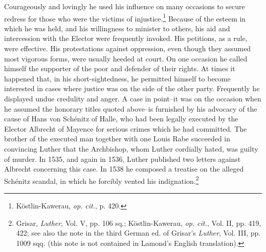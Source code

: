 Courageously and lovingly he used his influence on many occasions
to secure redress for those who were the victims of injustice.\footnote
{Köstlin-Kawerau, \textit{op. cit.}, p. 420.}
Because of the esteem in which he was held, and his willingness to
minister to others, his aid and intercession with the Elector were frequently
invoked. His petitions, as a rule, were effective. His protestations against
oppression, even though they assumed most vigorous
forms, were usually heeded at court. On one occasion he called
himself the supporter of the poor and defender of their rights. At
times it happened that, in his short-sightedness, he permitted himself
to become interested in cases where justice was on the side of the
other party. Frequently he displayed undue credulity and anger. A
case in point--it was on the occasion when he assumed the honorary
titles quoted above--is furnished by his advocacy of the cause of
Hans von Schénitz of Halle, who had been legally executed by the
Elector Albrecht of Mayence for serious crimes which he had committed.
The brother of the executed man together with one Louis
Rabe succeeded in convincing Luther that the Archbishop, whom
Luther cordially hated, was guilty of murder. In 1535, and again in
1536, Luther published two letters against Albrecht concerning this
case. In 1538 he composed a treatise on the alleged Schénitz scandal,
in which he forcibly vented his indignation.\footnote
{Grisar, \textit{Luther}, Vol. V, pp. 106 sq.; Köstlin-Kawerau, \textit{op. cit.}, Vol. II, pp. 419, 422;
see also the note in the third German ed. of Grisar’s \textit{Luther}, Vol. III, pp. 1009 sqq. (this
note is not contained in Lamond’s English translation).}

